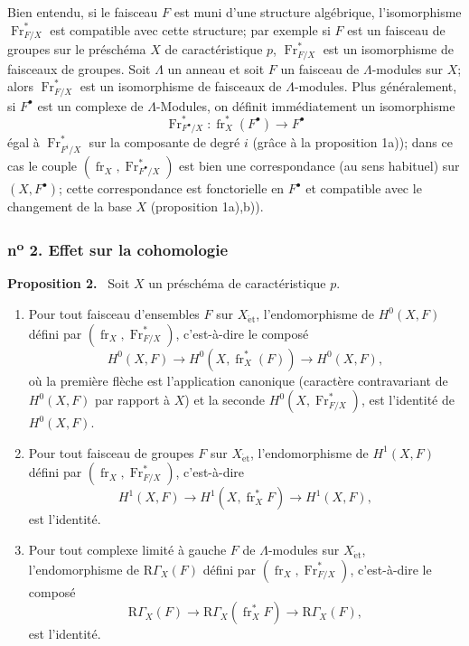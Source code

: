 \documentclass[11pt]{article}
\newenvironment{statement}[1]{\par\medskip\noindent\textbf{#1.}\ }{\par\medskip}
\providecommand{\et}{\mathrm{\acute{e}t}}
\providecommand{\RGamma}{\mathrm R\Gamma}
\providecommand{\RGamma}{\mathrm R\Gamma}
\providecommand{\fr}{\operatorname{fr}}
\providecommand{\Fr}{\operatorname{Fr}}
\providecommand{\Fr}{\operatorname{Fr}}
\providecommand{\fr}{\operatorname{fr}}
\providecommand{\RGamma}{\mathrm R\Gamma}
\providecommand{\et}{\acute{e}t}
\begin{document}
Bien entendu, si le faisceau $F$ est muni d'une structure algébrique, l'isomorphisme $\Fr^*_{F/X}$ est compatible avec cette structure; par exemple si $F$ est un faisceau de groupes sur le préschéma $X$ de caractéristique $p$, $\Fr^*_{F/X}$ est un isomorphisme de faisceaux de groupes. Soit $\Lambda$ un anneau et soit $F$ un faisceau de $\Lambda$-modules sur $X$; alors $\Fr^*_{F/X}$ est un isomorphisme de faisceaux de $\Lambda$-modules. Plus généralement, si $F^\bullet$ est un complexe de $\Lambda$-Modules, on définit immédiatement un isomorphisme
\[
\Fr^*_{F^\bullet/X}:\fr_X^*(F^\bullet)\longrightarrow F^\bullet
\]
égal à $\Fr^*_{F^i/X}$ sur la composante de degré $i$ (grâce à la proposition 1a)); dans ce cas le couple $(\fr_X,\Fr^*_{F^\bullet/X})$ est bien une correspondance (au sens habituel) sur $(X,F^\bullet)$; cette correspondance est fonctorielle en $F^\bullet$ et compatible avec le changement de la base $X$ (proposition 1a),b)).

\subsubsection*{n\textsuperscript{o} 2. Effet sur la cohomologie}

\begin{statement}{Proposition 2}
Soit $X$ un préschéma de caractéristique $p$.
\begin{enumerate}[label=\alph*)]
\item Pour tout faisceau d'ensembles $F$ sur $X_{\et}$, l'endomorphisme de $H^0(X,F)$ défini par $(\fr_X,\Fr^*_{F/X})$, c'est-à-dire le composé
\[
H^0(X,F)\longrightarrow H^0(X,\fr_X^*(F))\longrightarrow H^0(X,F),
\]
où la première flèche est l'application canonique (caractère contravariant de $H^0(X,F)$ par rapport à $X$) et la seconde $H^0(X,\Fr^*_{F/X})$, est l'identité de $H^0(X,F)$.
\item Pour tout faisceau de groupes $F$ sur $X_{\et}$, l'endomorphisme de $H^1(X,F)$ défini par $(\fr_X,\Fr^*_{F/X})$, c'est-à-dire
\[
H^1(X,F)\longrightarrow H^1(X,\fr_X^*F)\longrightarrow H^1(X,F),
\]
est l'identité.
\item Pour tout complexe limité à gauche $F$ de $\Lambda$-modules sur $X_{\et}$, l'endomorphisme de $\RGamma_X(F)$ défini par $(\fr_X,\Fr^*_{F/X})$, c'est-à-dire le composé
\[
\RGamma_X(F)\longrightarrow \RGamma_X(\fr_X^*F)\longrightarrow \RGamma_X(F),
\]
est l'identité.
\end{enumerate}
\end{statement}
\end{document}

